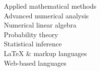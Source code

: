 \documentclass[letterpaper]{resume} %
\begin{document}
\begin{minipage}[t]{0.35\textwidth}
Applied mathematical methods \\
Advanced numerical analysis \\
Numerical linear algebra \\
Probability theory \\
Statistical inference \\
LaTeX \& markup languages \\
Web-based languages

\sectionspace %



\end{minipage} %
\hfill
%
%
\end{document}
